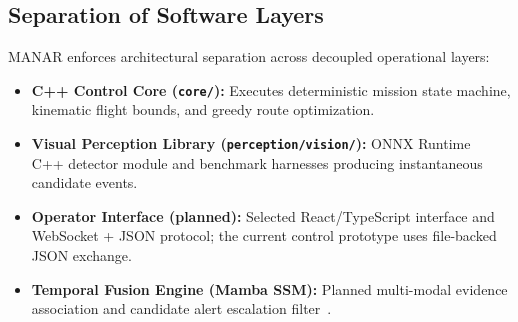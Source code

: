 \subsection{Separation of Software Layers}
MANAR enforces architectural separation across decoupled operational layers:
\begin{itemize}
    \item \textbf{C++ Control Core (\texttt{core/}):} Executes deterministic mission state machine, kinematic flight bounds, and greedy route optimization.
    \item \textbf{Visual Perception Library (\texttt{perception/vision/}):} ONNX Runtime~\cite{onnxruntime2019} C++ detector module and benchmark harnesses producing instantaneous candidate events.
    \item \textbf{Operator Interface (planned):} Selected React/TypeScript interface and WebSocket + JSON protocol; the current control prototype uses file-backed JSON exchange.
    \item \textbf{Temporal Fusion Engine (Mamba SSM):} Planned multi-modal evidence association and candidate alert escalation filter~\cite{gu2023mamba}.
\end{itemize}
